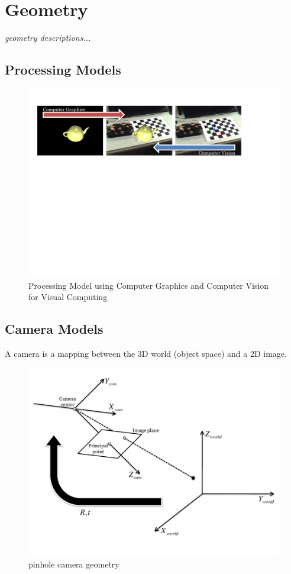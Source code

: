 \chapter{Geometry}\label{ch:geometry}
\begin{center}
{\small\em geometry descriptions...}
\end{center}

\section{Processing Models}
\begin{figure}[!h]
\centering
\includegraphics[width=6in]{images/processingmodel.pdf}
\caption{Processing Model using Computer Graphics and Computer Vision for Visual Computing}
\label{fig:processingmodel}
\end{figure}

\section{Camera Models}
A camera is a mapping between the 3D world (object space) and a 2D image\cite{CV_book_multiple_2000_Hartley}.

\begin{figure}[!h]
\centering
\includegraphics[width=6in]{images/cameramodel.pdf}
\caption{pinhole camera geometry}
\label{fig:cameramodel}
\end{figure}